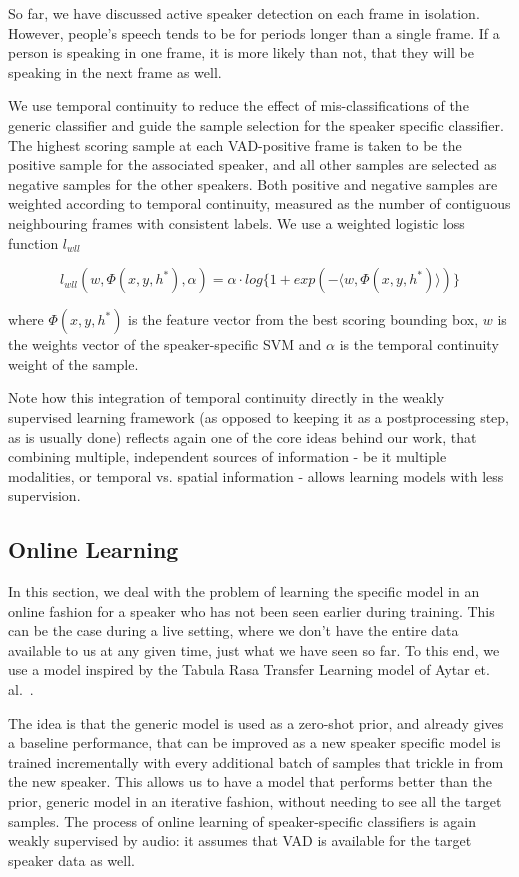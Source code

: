\documentclass[runningheads]{llncs}
\begin{document}
So far, we have discussed active speaker detection on each frame in isolation. However, people's speech tends to be for periods longer than a single frame. If a person is speaking in one frame, it is more likely than not, that they will be speaking in the next frame as well. 

We use temporal continuity to reduce the effect of mis-classifications of the generic classifier and guide the sample selection for the speaker specific classifier. 
The highest scoring sample at each VAD-positive frame is taken to be the positive sample for the associated speaker, and all other samples are selected as negative samples for the other speakers. Both positive and negative samples are weighted according to temporal continuity, measured as the number of contiguous neighbouring frames with consistent labels.
We use a weighted logistic loss function $l_{wll}$

\begin{dmath}
l_{wll}(w,\Phi(x,y,h^*),\alpha) = \alpha \cdot log\lbrace1+exp(-\langle w,\Phi(x,y,h^*) \rangle )\rbrace
\label{eq:weightedLogLoss}
\end{dmath}

where $\Phi(x,y,h^*)$ is the feature vector from the best scoring bounding box, $w$ is the weights vector of the speaker-specific SVM and $\alpha$ is the temporal continuity weight of the sample.

Note how this integration of temporal continuity directly in the weakly supervised learning framework (as opposed to keeping it as a postprocessing step, as is usually done) reflects again one of the core ideas behind our work, that combining multiple, independent sources of information - be it multiple modalities, or temporal vs. spatial information - allows learning models with less supervision. 


\subsection{Online Learning}
\label{onlineLearning}
In this section, we deal with the problem of learning the specific model in an online fashion for a speaker who has not been seen earlier during training. This can be the case during a live setting, where we don't have the entire data available to us at any given time, just what we have seen so far. To this end, we use a model inspired by the Tabula Rasa Transfer Learning model of Aytar et. al.~\cite{Aytar11}.

The idea is that the generic model is used as a zero-shot prior, and already gives a baseline performance, that can be improved as a new speaker specific model is trained incrementally with every additional batch of samples that trickle in from the new speaker. This allows us to have a model that performs better than the prior, generic model in an iterative fashion, without needing to see all the target samples. 
The process of online learning of speaker-specific classifiers is again weakly supervised by audio: it assumes that VAD is available for the target speaker data as well.
\end{document}
